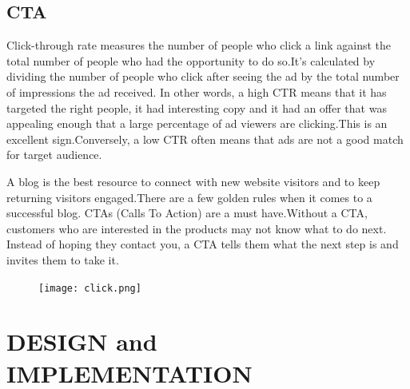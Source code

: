 \documentclass{fisatproject}
\begin{document}
\section{CTA}

Click-through rate measures the number of people who click a link against the total number of people who had the opportunity to do so.It’s calculated by dividing the number of people who click after seeing the ad by the total number of impressions the ad received.
In other words, a high CTR means that it has targeted the right people, it had interesting copy and it had an offer that was appealing enough that a large percentage of ad viewers are clicking.This is an excellent sign.Conversely, a low CTR often means that ads are not a good match for target audience.


A blog is the best resource to connect with new website visitors and to keep returning visitors engaged.There are a few golden rules when it comes to a successful blog. CTAs (Calls To Action) are a must have.Without a CTA, customers who are interested in the products may not know what to do next. Instead of hoping they contact you, a CTA tells them what the next step is and invites them to take it.
\begin{figure}
	\vspace*{1cm}
	\hspace*{0.01cm}\texttt{[image: click.png]}\hspace*{-cm}
\end{figure}

\chapter{DESIGN and IMPLEMENTATION}
\end{document}
